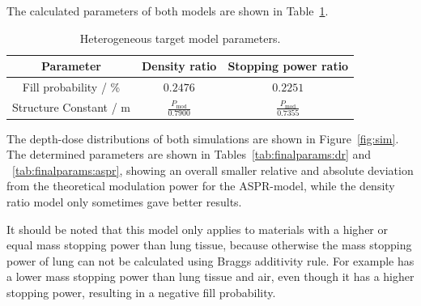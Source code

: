 \documentclass{article}
\begin{document}
The calculated parameters of both models are shown in Table~\ref{tab:params}.

\begin{table}[h]
    \centering
    \begin{tabular}{c|c|c}
         Parameter & Density ratio & Stopping power ratio \\
         \hline
         Fill probability / \% & $0.2476$ & $0.2251$ \\
         Structure Constant / m & $\frac{P_{\text{mod}}}{0.7900}$ & $\frac{P_{\text{mod}}}{0.7355}$ \\
    \end{tabular}
    \caption{Heterogeneous target model parameters.}
    \label{tab:params}
\end{table}

\pagebreak

The depth-dose distributions of both simulations are shown in Figure~\ref{fig:sim}.
The determined parameters are shown in Tables~\ref{tab:finalparams:dr} and ~\ref{tab:finalparams:aspr}, showing an overall smaller relative and absolute deviation from the theoretical modulation power for the ASPR-model, while the density ratio model only sometimes gave better results.

It should be noted that this model only applies to materials with a higher or equal mass stopping power than lung tissue, because otherwise the mass stopping power of lung can not be calculated using Braggs additivity rule.
For example  has a lower mass stopping power than lung tissue and air, even though it has a higher stopping power, resulting in a negative fill probability.
\end{document}
